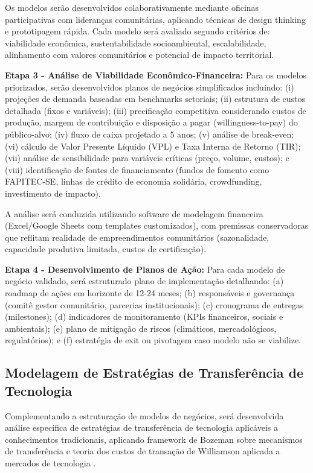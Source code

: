 Os modelos serão desenvolvidos colaborativamente mediante oficinas participativas com lideranças comunitárias, aplicando técnicas de design thinking e prototipagem rápida. Cada modelo será avaliado segundo critérios de: viabilidade econômica, sustentabilidade socioambiental, escalabilidade, alinhamento com valores comunitários e potencial de impacto territorial.

\textbf{Etapa 3 - Análise de Viabilidade Econômico-Financeira:} Para os modelos priorizados, serão desenvolvidos planos de negócios simplificados incluindo: (i) projeções de demanda baseadas em benchmarks setoriais; (ii) estrutura de custos detalhada (fixos e variáveis); (iii) precificação competitiva considerando custos de produção, margem de contribuição e disposição a pagar (willingness-to-pay) do público-alvo; (iv) fluxo de caixa projetado a 5 anos; (v) análise de break-even; (vi) cálculo de Valor Presente Líquido (VPL) e Taxa Interna de Retorno (TIR); (vii) análise de sensibilidade para variáveis críticas (preço, volume, custos); e (viii) identificação de fontes de financiamento (fundos de fomento como FAPITEC-SE, linhas de crédito de economia solidária, crowdfunding, investimento de impacto).

A análise será conduzida utilizando software de modelagem financeira (Excel/Google Sheets com templates customizados), com premissas conservadoras que reflitam realidade de empreendimentos comunitários (sazonalidade, capacidade produtiva limitada, custos de certificação).

\textbf{Etapa 4 - Desenvolvimento de Planos de Ação:} Para cada modelo de negócio validado, será estruturado plano de implementação detalhando: (a) roadmap de ações em horizonte de 12-24 meses; (b) responsáveis e governança (comitê gestor comunitário, parcerias institucionais); (c) cronograma de entregas (milestones); (d) indicadores de monitoramento (KPIs financeiros, sociais e ambientais); (e) plano de mitigação de riscos (climáticos, mercadológicos, regulatórios); e (f) estratégia de exit ou pivotagem caso modelo não se viabilize.

\subsection{Modelagem de Estratégias de Transferência de Tecnologia}

Complementando a estruturação de modelos de negócios, será desenvolvida análise específica de estratégias de transferência de tecnologia aplicáveis a conhecimentos tradicionais, aplicando framework de Bozeman \cite{Bozeman2000} sobre mecanismos de transferência e teoria dos custos de transação de Williamson aplicada a mercados de tecnologia \cite{AroraEtAl2001}.

